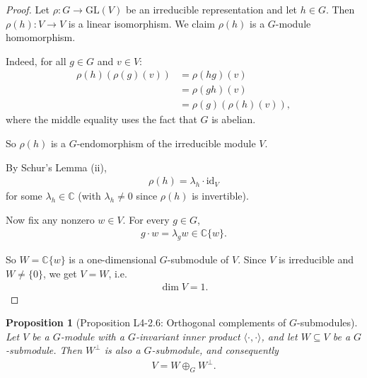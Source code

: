 \documentclass[titlepage]{article}
\theoremstyle{plain}
\newtheorem{proposition}[theorem]{Proposition}
\theoremstyle{definition}
\theoremstyle{remark}
\theoremstyle{exercise-style}
\numberwithin{equation}{section}
\numberwithin{theorem}{section}
\numberwithin{remark}{section}
\begin{document}
\begin{proof}
    Let $\rho : G \to \mathrm{GL}(V)$ be an irreducible representation and let $h \in G$. Then $\rho(h) : V \to V$ is a linear isomorphism. We claim $\rho(h)$ is a $G$-module homomorphism.
    
    Indeed, for all $g \in G$ and $v \in V$:
    \begin{align}
        \rho(h)(\rho(g)(v)) &= \rho(hg)(v) \\
        &= \rho(gh)(v) \\
        &= \rho(g)(\rho(h)(v)),
    \end{align}
    where the middle equality uses the fact that $G$ is abelian.
    
    So $\rho(h)$ is a $G$-endomorphism of the irreducible module $V$.
    
    By Schur’s Lemma (ii), 
    \begin{align}
        \rho(h) = \lambda_h \cdot \mathrm{id}_V
    \end{align}
    for some $\lambda_h \in \mathbb{C}$ (with $\lambda_h \neq 0$ since $\rho(h)$ is invertible).
    
    Now fix any nonzero $w \in V$. For every $g \in G$,
    \begin{align}
        g \cdot w = \lambda_g w \in \mathbb{C}\{w\}.
    \end{align}
    
    So $W = \mathbb{C}\{w\}$ is a one-dimensional $G$-submodule of $V$. Since $V$ is irreducible and $W \neq \{0\}$, we get $V = W$, i.e.
    \begin{align}
        \dim V = 1.
    \end{align}
\end{proof}

\begin{myboxg}
    \begin{proposition}[Proposition L4-2.6: Orthogonal complements of $G$-submodules]
        Let $V$ be a $G$-module with a $G$-invariant inner product $\langle \cdot, \cdot \rangle$, and let $W \subseteq V$ be a $G$-submodule. Then $W^\perp$ is also a $G$-submodule, and consequently
        \begin{align}
            V = W \oplus_G W^\perp.
        \end{align}
    \end{proposition}
\end{myboxg}
\end{document}
